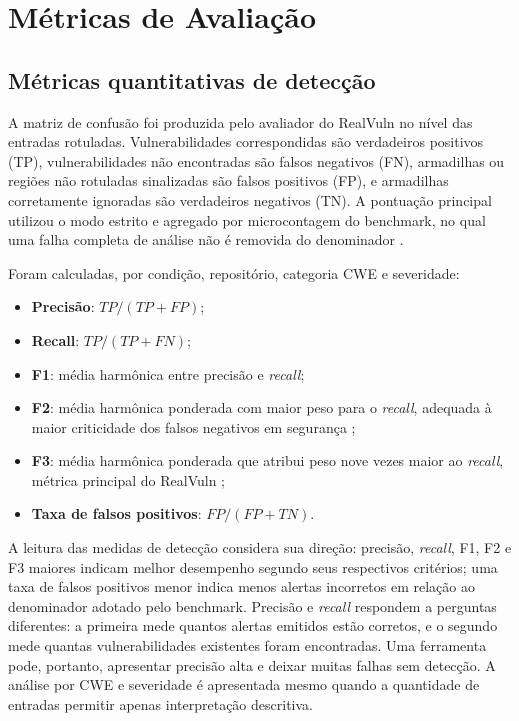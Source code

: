 \section{Métricas de Avaliação}\label{sec:metricas-metodologia}

\subsection{Métricas quantitativas de detecção}\label{subsec:metricas-quantitativas-metodologia}

A matriz de confusão foi produzida pelo avaliador do RealVuln no nível das entradas rotuladas. Vulnerabilidades correspondidas são verdadeiros positivos (TP), vulnerabilidades não encontradas são falsos negativos (FN), armadilhas ou regiões não rotuladas sinalizadas são falsos positivos (FP), e armadilhas corretamente ignoradas são verdadeiros negativos (TN). A pontuação principal utilizou o modo estrito e agregado por microcontagem do benchmark, no qual uma falha completa de análise não é removida do denominador \cite{Pellew2026RealVuln}.

Foram calculadas, por condição, repositório, categoria CWE e severidade:

\begin{itemize}
\item \textbf{Precisão}: $TP/(TP+FP)$;
\item \textbf{Recall}: $TP/(TP+FN)$;
\item \textbf{F1}: média harmônica entre precisão e \textit{recall};
\item \textbf{F2}: média harmônica ponderada com maior peso para o \textit{recall}, adequada à maior criticidade dos falsos negativos em segurança \cite{Kalouptsoglou2023VulnPrediction};
\item \textbf{F3}: média harmônica ponderada que atribui peso nove vezes maior ao \textit{recall}, métrica principal do RealVuln \cite{Pellew2026RealVuln};
\item \textbf{Taxa de falsos positivos}: $FP/(FP+TN)$.
\end{itemize}

A leitura das medidas de detecção considera sua direção: precisão, \textit{recall}, F1, F2 e F3 maiores indicam melhor desempenho segundo seus respectivos critérios; uma taxa de falsos positivos menor indica menos alertas incorretos em relação ao denominador adotado pelo benchmark. Precisão e \textit{recall} respondem a perguntas diferentes: a primeira mede quantos alertas emitidos estão corretos, e o segundo mede quantas vulnerabilidades existentes foram encontradas. Uma ferramenta pode, portanto, apresentar precisão alta e deixar muitas falhas sem detecção. A análise por CWE e severidade é apresentada mesmo quando a quantidade de entradas permitir apenas interpretação descritiva.

